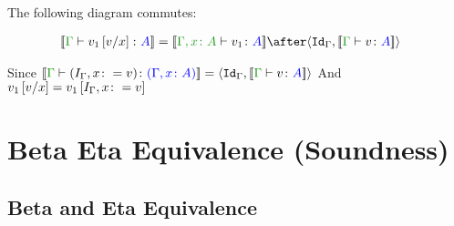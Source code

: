 \documentclass{report}
\begin{document}
The following diagram commutes:
\begin{framed}
    
    \begin{align*}
        \deno{\gtyperelation{v_1\ssub{x}{v}}{A}} &= \deno{\typerelation{\gax}{v_1}{A}}\after\pr{\idg}{\deno{\gtyperelation{v}{A}}}
    \end{align*}
    
    \centering
\end{framed}


Since $\deno{\gtyperelation{(I_{\G}, x\setto v)}{(\gax)}} = \pr{\idg}{\deno{\gtyperelation{v}{A}}}$
And $v_1\ssub{x}{v} = v_1\sub{I_{\G}, x\setto{v}}$


\chapter{Beta Eta Equivalence (Soundness)}
\section{Beta and Eta Equivalence}
\end{document}
